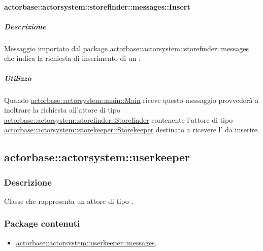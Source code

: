 \documentclass{scalatekids-article}
\begin{document}
\paragraph{actorbase::actorsystem::storefinder::messages::Insert}
\label{sec:actorbase::actorsystem::storefinder::messages::Insert}

\subparagraph{Descrizione}

Messaggio importato dal package \hyperref[sec:actorbase::actorsystem::storefinder::messages]{actorbase::\allowbreak{}actorsystem::\allowbreak{}storefinder::\allowbreak{}messages}
che indica la richiesta di inserimento di un .

\subparagraph{Utilizzo}

Quando \hyperref[sec:actorbase::actorsystem::main::Main]{actorbase::\allowbreak{}actorsystem::\allowbreak{}main::\allowbreak{}Main}
riceve questo messaggio provvederà a inoltrare la richiesta all'attore di tipo
\hyperref[sec:actorbase::actorsystem::storefinder::Storefinder]{actorbase::\allowbreak{}actorsystem::\allowbreak{}storefinder::\allowbreak{}Storefinder}
contenente l'attore di tipo
\hyperref[sec:actorbase::actorsystem::storekeeper::Storekeeper]{actorbase::\allowbreak{}actorsystem::\allowbreak{}storekeeper::\allowbreak{}Storekeeper}
destinato a ricevere l' da inserire.

\subsection{actorbase::actorsystem::userkeeper}
\label{sec:actorbase::actorsystem::userkeeper}

\subsubsection{Descrizione}

Classe che rappresenta un attore di tipo .

\subsubsection{Package contenuti}

\begin{itemize}

\item \hyperref[sec:actorbase::actorsystem::userkeeper::messages]{actorbase::actorsystem::userkeeper::messages}.

\end{itemize}
\end{document}
